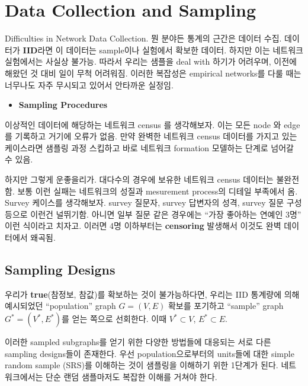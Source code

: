 \documentclass[
]{book}
\providecommand{\tightlist}{%
  \setlength{\itemsep}{0pt}\setlength{\parskip}{0pt}}
\begin{document}
{{{{\section{Data Collection and Sampling}\label{data-collection-and-sampling}}

Difficulties in Network Data Collection. 뭔 분야든 통계의 근간은 데이터 수집. 데이터가 \textbf{IID}라면 이 데이터는 sample이나 실험에서 확보한 데이터. 하지만 이는 네트워크 실험에서는 사실상 불가능. 따라서 우리는 샘플을 deal with 하기가 어려우며, 이전에 해왔던 것 대비 일이 무척 어려워짐. 이러한 복잡성은 empirical networks를 다룰 때는 너무나도 자주 무시되고 있어서 안타까운 실정임.

\begin{itemize}
\tightlist
\item
  \textbf{Sampling Procedures}
\end{itemize}

이상적인 데이터에 해당하는 네트워크 census 를 생각해보자. 이는 모든 node 와 edge 를 기록하고 거기에 오류가 없음. 만약 완벽한 네트워크 census 데이터를 가지고 있는 케이스라면 샘플링 과정 스킵하고 바로 네트워크 formation 모델하는 단계로 넘어갈 수 있음.

하지만 그렇게 운좋을리가. 대다수의 경우에 보유한 네트워크 census 데이터는 불완전함. 보통 이런 실패는 네트워크의 성질과 mesurement process의 디테일 부족에서 옴. Survey 케이스를 생각해보자. survey 질문자, survey 답변자의 성격, survey 질문 구성 등으로 이런건 널뛰기함. 아니면 일부 질문 같은 경우에는 ``가장 좋아하는 연예인 3명'' 이런 식이라고 치자고. 이러면 4명 이하부터는 \textbf{censoring} 발생해서 이것도 완벽 데이터에서 왜곡됨.

\hypertarget{sampling-designs}{%
\subsection{Sampling Designs}\label{sampling-designs}}

우리가 \textbf{true}(참정보, 참값)를 확보하는 것이 불가능하다면, 우리는 IID 통계량에 의해 예시되었던 ``population'' graph \(G = (V, E)\) 확보를 포기하고 ``sample'' graph \(G^\ast = (V^\ast, E^\ast)\)를 얻는 쪽으로 선회한다. 이때 \(V^\ast \subset V\), \(E^\ast \subset E\).

이러한 sampled subgraphs를 얻기 위한 다양한 방법들에 대응되는 서로 다른 sampling designs들이 존재한다. 우선 population으로부터의 units들에 대한 simple random sample (SRS)를 이해하는 것이 샘플링을 이해하기 위한 1단계가 된다. 네트워크에서는 단순 랜덤 샘플마저도 복잡한 이해를 거쳐야 한다.

}}}
\end{document}
